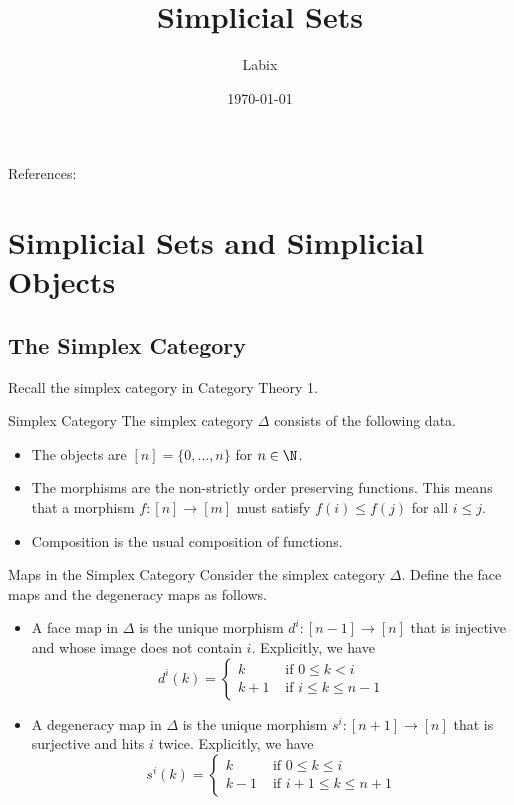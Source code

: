 \documentclass[a4paper]{article}
\title{Simplicial Sets}
\author{Labix}
\date{\today}
\begin{document}
\maketitle
\begin{abstract}

\end{abstract}
References: 

\pagebreak
\tableofcontents

\pagebreak

\section{Simplicial Sets and Simplicial Objects}
\subsection{The Simplex Category}
Recall the simplex category in Category Theory 1. 

\begin{defn}{Simplex Category}{} The simplex category $\Delta$ consists of the following data. 
\begin{itemize}
\item The objects are $[n]=\{0,\dots,n\}$ for $n\in\N$. 
\item The morphisms are the non-strictly order preserving functions. This means that a morphism $f:[n]\to[m]$ must satisfy $f(i)\leq f(j)$ for all $i\leq j$. 
\item Composition is the usual composition of functions. 
\end{itemize}
\end{defn}

\begin{defn}{Maps in the Simplex Category}{} Consider the simplex category $\Delta$. Define the face maps and the degeneracy maps as follows. 
\begin{itemize}
\item A face map in $\Delta$ is the unique morphism $d^i:[n-1]\to[n]$ that is injective and whose image does not contain $i$. Explicitly, we have $$d^i(k)=\begin{cases}
k & \text{ if } 0\leq k <i\\
k+1 & \text{ if } i\leq k\leq n-1
\end{cases}$$
\item A degeneracy map in $\Delta$ is the unique morphism $s^i:[n+1]\to[n]$ that is surjective and hits $i$ twice. Explicitly, we have $$s^i(k)=\begin{cases}
k & \text{ if } 0\leq k\leq i\\
k-1 & \text{ if } i+1\leq k\leq n+1
\end{cases}$$
\end{itemize}
\end{defn}
\end{document}
